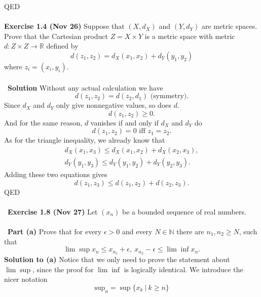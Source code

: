 \documentclass[12 pt]{article}
\newcommand{\R}{\mathbb{R}}
\newcommand{\N}{\mathbb{N}}
\numberwithin{equation}{section}
\begin{document}
{QED\\
\\
\textbf{Exercise 1.4 (Nov 26)} Suppose that $(X, d_X)$ and $(Y, d_Y)$ are metric spaces. Prove that the Cartesian product $Z = X \times Y$ is a metric space with metric $d: Z \times Z \to \R$ defined by \begin{equation*}
d(z_1, z_2) = d_X(x_1, x_2) + d_Y(y_1, y_2)
\end{equation*}
where $z_i = (x_i, y_i)$.\\
\\
\
\textbf{Solution} Without any actual calculation we have \begin{equation*}
d(z_1, z_2) = d(z_2, d_1) \mbox{ (symmetry)}.
\end{equation*}
Since $d_X$ and $d_Y$ only give nonnegative values, so does $d$. \begin{equation*}
d(z_1, z_2) \geq 0.
\end{equation*}
And for the same reason, $d$ vanishes if and only if $d_X$ and $d_Y$ do \begin{equation*}
d(z_1, z_2) = 0 \mbox{ iff } z_1 = z_2.
\end{equation*}
As for the triangle inequality, we already know that \begin{align*}
d_X(x_1, x_3) \leq d_X(x_1, x_2) + d_X(x_2, x_3), \\
d_Y(y_1, y_3) \leq d_Y(y_1, y_2) + d_Y(y_2, y_3).
\end{align*}
Adding these two equations gives \begin{equation*}
d(z_1, z_3) \leq d(z_1, z_2) + d(z_2, z_3).
\end{equation*}
QED\\
\\
\
\textbf{Exercise 1.8 (Nov 27)} Let $(x_n)$ be a bounded sequence of real numbers. \\
\\
\
\textbf{Part (a)} Prove that for every $\epsilon > 0$ and every $N \in \N$ there are $n_1, n_2 \geq N$, such that \begin{equation*}
\lim \sup x_n \leq x_{n_1} + \epsilon, \ x_{n_2} - \epsilon \leq \lim \inf x_n .
\end{equation*}
\textbf{Solution to (a)} Notice that we only need to prove the statement about $\lim \sup$, since the proof for $\lim \inf$ is logically identical. We introduce the nicer notation \begin{equation*}
\mbox{sup} _n = \sup \{ x_k \ | \ k \geq n \}
\end{equation*}
}
\end{document}
